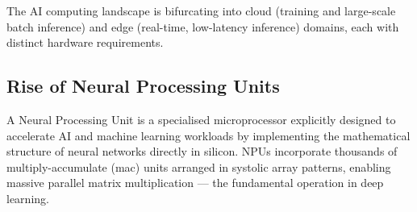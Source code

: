 The AI computing landscape is bifurcating into cloud (training and large-scale
batch inference) and edge (real-time, low-latency inference) domains, each with
distinct hardware requirements.

\subsection{Rise of Neural Processing Units}
\label{subsec:npu-rise}

A Neural Processing Unit is a specialised microprocessor explicitly designed
to accelerate AI and machine learning workloads by implementing the
mathematical structure of neural networks directly in silicon. NPUs incorporate
thousands of multiply-accumulate (\acrshort{mac}) units arranged in systolic
array patterns, enabling massive parallel matrix multiplication — the
fundamental operation in deep learning.


